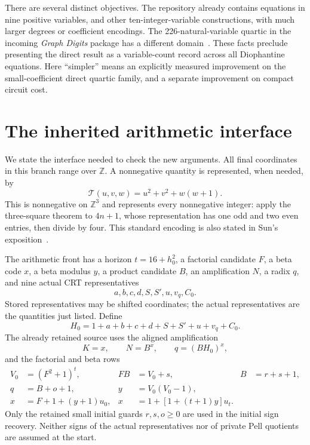 \documentclass[11pt,letterpaper]{article}
\theoremstyle{definition}\newtheorem{definition}[theorem]{Definition}
\theoremstyle{remark}\newtheorem{remark}[theorem]{Remark}
\newcommand{\Z}{\ensuremath{\mathbb Z}}
\begin{document}
There are several distinct objectives. The repository already contains equations in nine positive variables, and other ten-integer-variable constructions, with much larger degrees or coefficient encodings. The 226-natural-variable quartic in the incoming \emph{Graph Digits} package has a different domain~\cite{graphdigits}. These facts preclude presenting the direct result as a variable-count record across all Diophantine equations. Here ``simpler'' means an explicitly measured improvement on the small-coefficient direct quartic family, and a separate improvement on compact circuit cost.

\section{The inherited arithmetic interface}\label{sec:interface}

We state the interface needed to check the new arguments. All final coordinates in this branch range over \Z. A nonnegative quantity is represented, when needed, by
\begin{equation}\label{eq:ternary}
 \mathcal T(u,v,w)=u^2+v^2+w(w+1).
\end{equation}
This is nonnegative on \(\Z^3\) and represents every nonnegative integer: apply the three-square theorem to \(4n+1\), whose representation has one odd and two even entries, then divide by four. This standard encoding is also stated in Sun's exposition~\cite{sun2026}.

The arithmetic front has a horizon \(t=16+h_0^2\), a factorial candidate \(F\), a beta code \(x\), a beta modulus \(y\), a product candidate \(B\), an amplification \(N\), a radix \(q\), and nine actual CRT representatives
\[
 a,b,c,d,S,S',u,v_q,C_0.
\]
Stored representatives may be shifted coordinates; the actual representatives are the quantities just listed. Define
\[
 H_0=1+a+b+c+d+S+S'+u+v_q+C_0.
\]
The already retained source uses the aligned amplification
\begin{equation}\label{eq:aligned}
 K=x,\qquad N=B^x,\qquad q=(BH_0)^x,
\end{equation}
and the factorial and beta rows
\begin{align}
 V_0&=(F^2+1)^t,& FB&=V_0+s,&B&=r+s+1,\\
 q&=B+o+1,& y&=V_0(V_0-1),\\
 x&=F+1+(y+1)u_0,&x&=1+[1+(t+1)y]u_t.\label{eq:endpoints}
\end{align}
Only the retained small initial guards \(r,s,o\ge0\) are used in the initial sign recovery. Neither signs of the actual representatives nor of private Pell quotients are assumed at the start.
\end{document}
